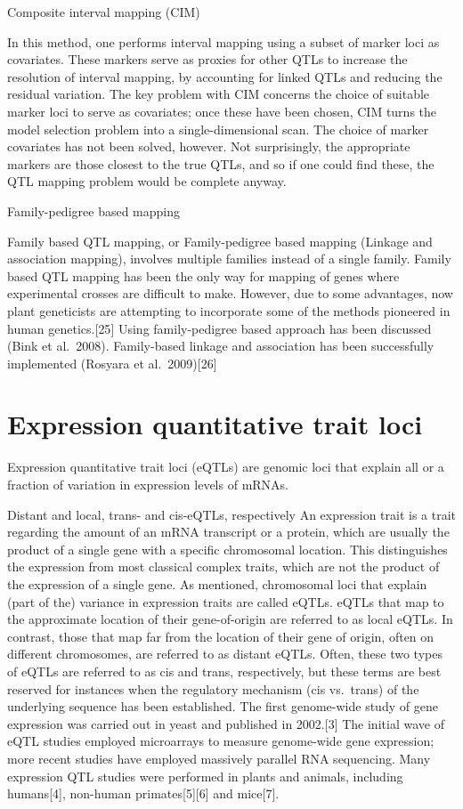 Composite interval mapping (CIM)

In this method, one performs interval mapping using a subset of marker loci as covariates. These markers serve as proxies for other QTLs to increase the resolution of interval mapping, by accounting for linked QTLs and reducing the residual variation. The key problem with CIM concerns the choice of suitable marker loci to serve as covariates; once these have been chosen, CIM turns the model selection problem into a single-dimensional scan. The choice of marker covariates has not been solved, however. Not surprisingly, the appropriate markers are those closest to the true QTLs, and so if one could find these, the QTL mapping problem would be complete anyway.

Family-pedigree based mapping

Family based QTL mapping, or Family-pedigree based mapping (Linkage and association mapping), involves multiple families instead of a single family. Family based QTL mapping has been the only way for mapping of genes where experimental crosses are difficult to make. However, due to some advantages, now plant geneticists are attempting to incorporate some of the methods pioneered in human genetics.{[}25{]} Using family-pedigree based approach has been discussed (Bink et al.~2008). Family-based linkage and association has been successfully implemented (Rosyara et al.~2009){[}26{]}

\hypertarget{expression-quantitative-trait-loci}{%
\section{Expression quantitative trait loci}\label{expression-quantitative-trait-loci}}

Expression quantitative trait loci (eQTLs) are genomic loci that explain all or a fraction of variation in expression levels of mRNAs.

Distant and local, trans- and cis-eQTLs, respectively
An expression trait is a trait regarding the amount of an mRNA transcript or a protein, which are usually the product of a single gene with a specific chromosomal location. This distinguishes the expression from most classical complex traits, which are not the product of the expression of a single gene. As mentioned, chromosomal loci that explain (part of the) variance in expression traits are called eQTLs. eQTLs that map to the approximate location of their gene-of-origin are referred to as local eQTLs. In contrast, those that map far from the location of their gene of origin, often on different chromosomes, are referred to as distant eQTLs. Often, these two types of eQTLs are referred to as cis and trans, respectively, but these terms are best reserved for instances when the regulatory mechanism (cis vs.~trans) of the underlying sequence has been established. The first genome-wide study of gene expression was carried out in yeast and published in 2002.{[}3{]} The initial wave of eQTL studies employed microarrays to measure genome-wide gene expression; more recent studies have employed massively parallel RNA sequencing. Many expression QTL studies were performed in plants and animals, including humans{[}4{]}, non-human primates{[}5{]}{[}6{]} and mice{[}7{]}.

